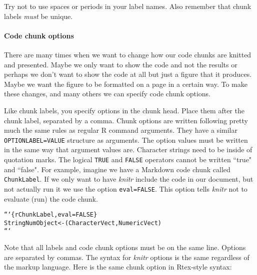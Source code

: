 {Try not to use spaces or periods in your label names. Also remember that chunk labels {\emph{must}} be unique.

\paragraph{Code chunk options}

There are many times when we want to change how our code chunks are knitted and presented. Maybe we only want to show the code and not the results or perhaps we don't want to show the code at all but just a figure that it produces. Maybe we want the figure to be formatted on a page in a certain way. To make these changes, and many others we can specify code chunk options.

Like chunk labels, you specify options in the chunk head. Place them after the chunk label, separated by a comma. Chunk options are written following pretty much the same rules as regular R command arguments. They have a similar \texttt{OPTIONLABEL=VALUE} structure as arguments. The option values must be written in the same way that argument values are. Character strings need to be inside of quotation marks. The logical \texttt{TRUE} and \texttt{FALSE} operators cannot be written ``true" and ``false". For example, imagine we have a Markdown code chunk called \texttt{ChunkLabel}. If we only want to have {\emph{knitr}} include the code in our document, but not actually run it we use the option \texttt{eval=FALSE}. This option tells {\emph{knitr}} not to evaluate (run) the code chunk.

\begin{knitrout}
\color{fgcolor}\begin{kframe}
\begin{alltt}
```\{r ChunkLabel, eval=FALSE\}
StringNumObject <- (CharacterVect, NumericVect)
```
\end{alltt}
\end{kframe}
\end{knitrout}


\noindent Note that all labels and code chunk options must be on the same line. Options are separated by commas. The syntax for {\emph{knitr}} options is the same regardless of the markup language. Here is the same chunk option in Rtex-style syntax:

\begin{knitrout}
\color{fgcolor}\begin{kframe}
\begin{alltt}
%% begin.rcode ChunkLabel, eval=FALSE
% \hlcomment{# Example of a non-evaluated code chunk}
% StringNumObject <- \hlfunctioncall{cbind}(CharacterVect, NumericVect)
%%
\end{alltt}
\end{kframe}
\end{knitrout}


}
